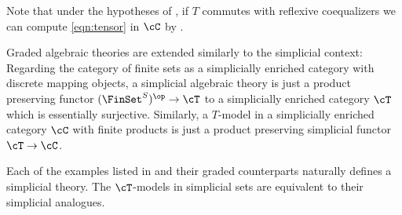 \documentclass[leqno,oneside,english]{elsarticle}
\begin{document}
Note that under the hypotheses of , if $T$
commutes with reflexive coequalizers we can compute \eqref{eqn:tensor} in $\cC$ by .

Graded algebraic theories are extended similarly to the simplicial
context: Regarding the category of finite sets as a simplicially enriched
category with discrete mapping objects, a simplicial algebraic theory
is just a product preserving functor $(\FinSet^S)^{\op}\rightarrow
\cT$ to a simplicially enriched category $\cT$ which is essentially
surjective. Similarly, a $T$-model in a
simplicially enriched category $\cC$ with finite products is just a product
preserving simplicial functor $\cT\rightarrow \cC$.

\begin{example}\label{ex:simplicial-theories}
  Each of the examples listed in  and their graded
  counterparts naturally defines a
  simplicial theory. The $\cT$-models in simplicial sets are
  equivalent to their simplicial analogues.
\end{example}
\end{document}
